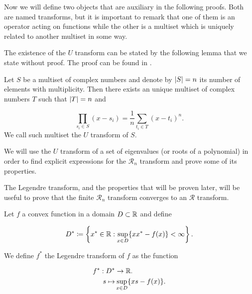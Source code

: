 Now we will define two objects that are auxiliary in the following proofs. Both are named transforms, but it is important to remark that one of them is an operator acting on functions while the other is a multiset which is uniquely related to another multiset in some way.

The existence of the $U$ transform can be stated by the following lemma that we state without proof. The proof can be found in \cite{anaya2016cumulantes}.

\begin{lemma}[$U$ transform]
    Let $S$ be a multiset of complex numbers and denote by $\lvert S \rvert=n$ its number of elements with multiplicity. Then there exists an unique multiset of complex numbers $T$ such that $\lvert T \rvert=n$ and 

    \begin{equation*}
        \prod_{s_i \in S} (x-s_i) = \frac 1n \sum_{t_i \in T} (x-t_i)^n.
    \end{equation*}
    We call such multiset the $U$ transform of $S$.
\end{lemma}

We will use the $U$ transform of a set of eigenvalues (or roots of a polynomial) in order to find explicit expressions for the $\mathcal R_n$ transform and prove some of its properties. 

The Legendre transform, and the properties that will be proven later, will be useful to prove that the finite $\mathcal R_n$ transform converges to an $\mathcal R$ transform.

\begin{definition}
    Let $f$ a convex function in a domain $D\subset \mathbb R$ and define

    \begin{equation} \label{eq:legendre_set}
        D^* \coloneqq \left\{ x^* \in \mathbb R \mathrel{:} \sup_{x \in D} \{xx^* - f(x)\} < \infty \right\}.
    \end{equation}

    We define $f^*$ the Legendre transform of $f$ as the function

    \begin{align*}
        f^* : D^* &\to \mathbb R.\\
        s \mapsto &\sup_{x \in D} \{ xs - f(x) \}.
    \end{align*}
\end{definition}

